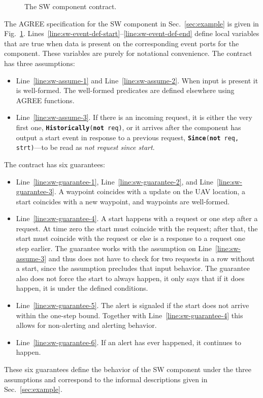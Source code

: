 \documentclass[global,twocolumn]{svjour}
\newcommand{\figref}[1]{Fig.~\ref{#1}}
\newcommand{\secref}[1]{Sec.~\ref{#1}}
\newcommand{\lineref}[1]{Line~\ref{#1}}
\newcommand{\linesref}[2]{Lines~\ref{#1}--\ref{#2}}
\begin{document}
\begin{figure}
  \begin{center}
    \scalebox{0.62}{\usebox{\sw}}
  \end{center}
  \caption{The SW component contract.}
  \label{fig:sw}
\end{figure}

The AGREE specification for the SW component in \secref{sec:example} is given in \figref{fig:sw}.
%
\linesref{line:sw-event-def-start}{line:sw-event-def-end} define local variables that are true when data is present on the corresponding event ports for the component.  These variables are
purely for notational convenience.
%
The contract has three assumptions:
%
\begin{itemize}
\item
\lineref{line:sw-assume-1} and \lineref{line:sw-assume-2}.
%
When input is present it is well-formed.
%
The well-formed predicates are defined elsewhere using AGREE functions.

\item
\lineref{line:sw-assume-3}.
%
If there is an incoming request, it is either the very first one, \texttt{\textbf{Historically}(\textbf{not} req)}, or it arrives after the component has output a start event in response to a previous request, \texttt{\textbf{Since}(\textbf{not} req, strt)}---to be read as \emph{not
request since start}.
\end{itemize}

\noindent The contract has six guarantees:
%
\begin{itemize}
\item
\lineref{line:sw-guarantee-1}, \lineref{line:sw-guarantee-2}, and \lineref{line:sw-guarantee-3}.
%
A waypoint coincides with a update on the UAV location, a start coincides with a new waypoint, and waypoints are well-formed.

\item
\lineref{line:sw-guarantee-4}.
%
A start happens with a request or one step after a request.
%
At time zero the start must coincide with the request;
%
after that, the start must coincide with the request or else is a response to a request one step earlier.
%
The guarantee works with the assumption on \lineref{line:sw-assume-3} and thus does not have to check for two requests in a row without a start, since the assumption precludes that input behavior.
%
The guarantee also does not force the start to always happen, it only says that if it does happen, it is under the defined conditions.

\item
\lineref{line:sw-guarantee-5}.
%
The alert is signaled if the start does not arrive within the one-step bound.
%
Together with \lineref{line:sw-guarantee-4} this allows for non-alerting and alerting behavior.

\item
%
\lineref{line:sw-guarantee-6}.
%
If an alert has ever happened, it continues to happen.
\end{itemize}
%
These six guarantees define the behavior of the SW component under the three assumptions and correspond to the informal descriptions given in \secref{sec:example}.
\end{document}
